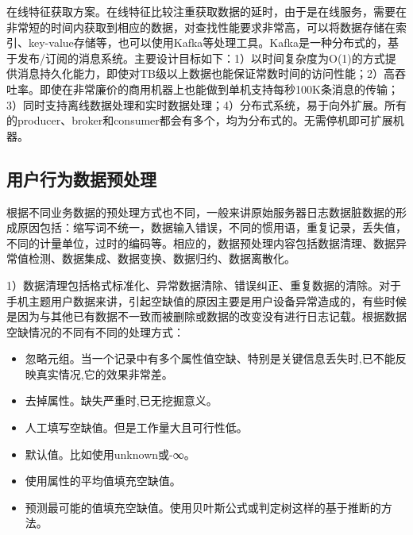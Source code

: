   在线特征获取方案。在线特征比较注重获取数据的延时，由于是在线服务，需要在非常短的时间内获取到相应的数据，对查找性能要求非常高，可以将数据存储在索引、key-value存储等，也可以使用Kafka等处理工具。Kafka是一种分布式的，基于发布/订阅的消息系统。主要设计目标如下：1）以时间复杂度为O(1)的方式提供消息持久化能力，即使对TB级以上数据也能保证常数时间的访问性能；2）高吞吐率。即使在非常廉价的商用机器上也能做到单机支持每秒100K条消息的传输；3）同时支持离线数据处理和实时数据处理；4）分布式系统，易于向外扩展。所有的producer、broker和consumer都会有多个，均为分布式的。无需停机即可扩展机器。

  \subsection{用户行为数据预处理}
  根据不同业务数据的预处理方式也不同，一般来讲原始服务器日志数据脏数据的形成原因包括：缩写词不统一，数据输入错误，不同的惯用语，重复记录，丢失值，不同的计量单位，过时的编码等。相应的，数据预处理内容包括数据清理、数据异常值检测、数据集成、数据变换、数据归约、数据离散化。

  1）数据清理包括格式标准化、异常数据清除、错误纠正、重复数据的清除。对于手机主题用户数据来讲，引起空缺值的原因主要是用户设备异常造成的，有些时候是因为与其他已有数据不一致而被删除或数据的改变没有进行日志记载。根据数据空缺情况的不同有不同的处理方式：
  \begin{itemize}
  \item 忽略元组。当一个记录中有多个属性值空缺、特别是关键信息丢失时,已不能反映真实情况,它的效果非常差。
  \item 去掉属性。缺失严重时,已无挖掘意义。
  \item 人工填写空缺值。但是工作量大且可行性低。
  \item 默认值。比如使用unknown或-∞。
  \item 使用属性的平均值填充空缺值。
  \item 预测最可能的值填充空缺值。使用贝叶斯公式或判定树这样的基于推断的方法。
  \end{itemize}

